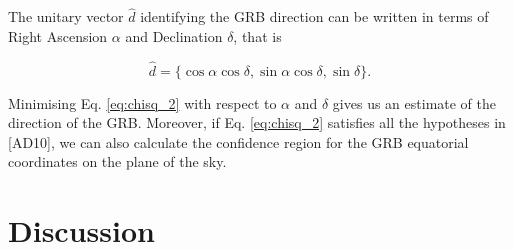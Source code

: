 \documentclass[]{spie}  %
\begin{document}
The unitary vector $\hat{d}$ identifying the GRB direction can be written in terms of Right Ascension $\alpha$ and Declination $\delta$, that is
  
  \begin{equation}
    \hat{d} = \{\cos{\alpha} \cos{\delta}, \sin{\alpha} \cos{\delta}, \sin{\delta}\}.
  \end{equation}

Minimising Eq. \ref{eq:chisq_2} with respect to $\alpha$ and $\delta$ gives us an estimate of the direction of the GRB.
Moreover, if Eq. \ref{eq:chisq_2} satisfies all the hypotheses in [AD10], we can also calculate the confidence region for the GRB equatorial coordinates on the plane of the sky.

\section{Discussion}
\end{document}
